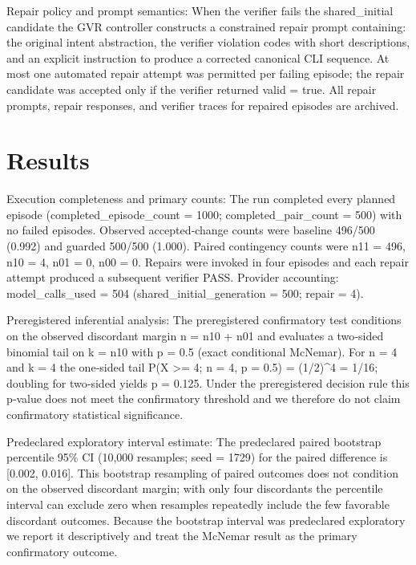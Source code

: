 \documentclass[conference]{IEEEtran}
\begin{document}
Repair policy and prompt semantics: When the verifier fails the shared\_initial candidate the GVR controller constructs a constrained repair prompt containing: the original intent abstraction, the verifier violation codes with short descriptions, and an explicit instruction to produce a corrected canonical CLI sequence. At most one automated repair attempt was permitted per failing episode; the repair candidate was accepted only if the verifier returned valid = true. All repair prompts, repair responses, and verifier traces for repaired episodes are archived.

\section{Results}
Execution completeness and primary counts: The run completed every planned episode (completed\_episode\_count = 1000; completed\_pair\_count = 500) with no failed episodes. Observed accepted‑change counts were baseline 496/500 (0.992) and guarded 500/500 (1.000). Paired contingency counts were n11 = 496, n10 = 4, n01 = 0, n00 = 0. Repairs were invoked in four episodes and each repair attempt produced a subsequent verifier PASS. Provider accounting: model\_calls\_used = 504 (shared\_initial\_generation = 500; repair = 4).

Preregistered inferential analysis: The preregistered confirmatory test conditions on the observed discordant margin n = n10 + n01 and evaluates a two‑sided binomial tail on k = n10 with p = 0.5 (exact conditional McNemar). For n = 4 and k = 4 the one‑sided tail P(X >= 4; n = 4, p = 0.5) = (1/2)\textasciicircum{}4 = 1/16; doubling for two‑sided yields p = 0.125. Under the preregistered decision rule this p‑value does not meet the confirmatory threshold and we therefore do not claim confirmatory statistical significance.

Predeclared exploratory interval estimate: The predeclared paired bootstrap percentile 95\% CI (10,000 resamples; seed = 1729) for the paired difference is [0.002, 0.016]. This bootstrap resampling of paired outcomes does not condition on the observed discordant margin; with only four discordants the percentile interval can exclude zero when resamples repeatedly include the few favorable discordant outcomes. Because the bootstrap interval was predeclared exploratory we report it descriptively and treat the McNemar result as the primary confirmatory outcome.
\end{document}
